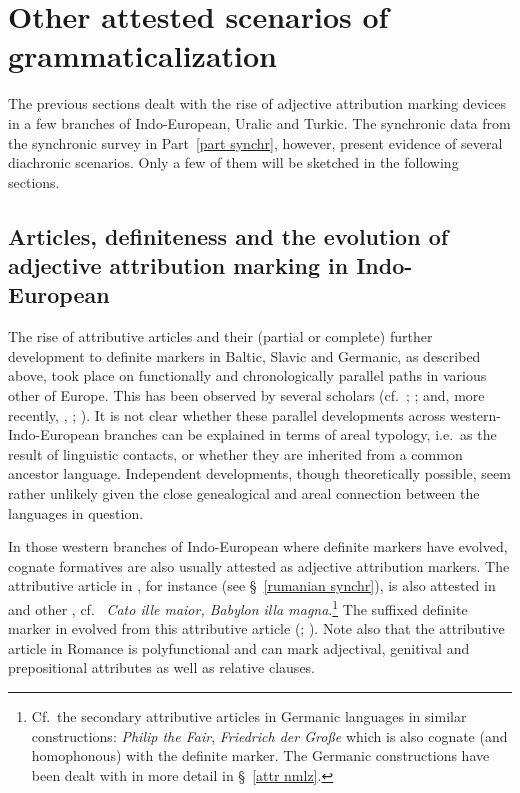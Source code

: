 {\section{Other attested scenarios of grammaticalization}
The previous sections dealt with the rise of adjective attribution marking devices in a few branches of Indo-European, Uralic and Turkic. The synchronic data from the synchronic survey in Part~\ref{part synchr}, however, present evidence of several diachronic scenarios. Only a few of them will be sketched in the following sections.

\subsection[Articles, definiteness and adjective attribution]{Articles, definiteness and the evolution of adjective attribution marking in Indo-European}
The rise of attributive articles and their (partial or complete) further development to definite markers in Baltic, Slavic and Germanic, as described above, took place on functionally and chronologically parallel paths in various other  of Europe. This has been observed by several scholars (cf.~\citealt{brugmann-etal1916}; \citealt{gamillscheg1937}; \citealt{heinrichs1954} and, more recently, \citealt{nocentini1996}, \citealt{philippi1997}; \citealt{himmelmann1997}). It is not clear whether these parallel developments across western-Indo-European branches can be explained in terms of areal typology, i.e.~as the result of linguistic contacts, or whether they are inherited from a common ancestor language. Independent developments, though theoretically possible, seem rather unlikely given the close genealogical and areal connection between the languages in question.

In those western branches of Indo-European where definite markers have evolved, cognate formatives are also usually attested as adjective attribution markers. The attributive article in , for instance (see \S~\ref{rumanian synchr}), is also attested in  and other , cf.~ \textit{Cato ille maior, Babylon illa magna}.\footnote{Cf.~the secondary attributive articles in Germanic languages in similar constructions:  \textit{Philip the Fair},  \textit{Friedrich der Große} which is also cognate (and homophonous) with the definite marker. The Germanic constructions have been dealt with in more detail in \S~\ref{attr nmlz}.} The suffixed definite marker in  evolved from this attributive article (\citealt{gamillscheg1937}; \citealt[5]{nocentini1996}). Note also that the attributive article in Romance is polyfunctional and can mark adjectival, genitival and prepositional attributes as well as relative clauses.

}
